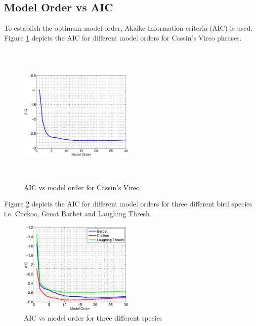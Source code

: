 \documentclass[a4paper]{article}
\begin{document}
 \subsection{Model Order  vs AIC}
 
 
 To establish the optimum model order, Akaike Information criteria (AIC)  \cite{makhoul} is used. Figure \ref{fig:AIC_cassins} depicts the AIC for different model orders for Cassin's Vireo phrases.  
 
 
 \begin{figure}[!ht]
	\centering
	\includegraphics[width=0.5\textwidth,height=7cm] {cassins_AIC.eps}
	\caption{AIC vs model order for Cassin's Vireo }   
	\label{fig:AIC_cassins}
\end{figure} 

 
 
Figure \ref{fig:AIC_3} depicts the AIC for different model orders for three different bird species i.e. Cuckoo, Great Barbet and Laughing Thresh. 

 \begin{figure}[!ht]
	\centering
	\includegraphics[width=0.5\textwidth,height=7 cm] {model_order_vs_AIC.eps}
	\caption{AIC vs model order for three different species }   
	\label{fig:AIC_3}
\end{figure} 
\end{document}
